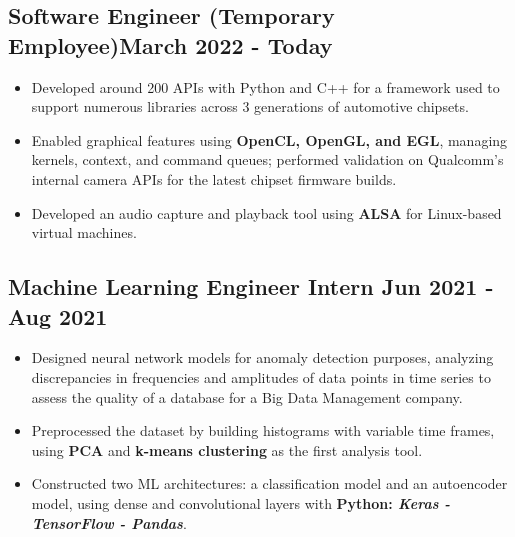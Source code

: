 \documentclass[]{article}
\begin{document}
\vspace{1ex}

\subsection{{Software Engineer (Temporary Employee)\hfill{\small{March 2022 - Today}}}}
\vspace{1.5ex}
\begin{itemize}
    \item Developed around 200 APIs with Python and C++ for a framework used to support numerous libraries across 3 generations of automotive chipsets.
    \item Enabled graphical features using \textbf{OpenCL, OpenGL, and EGL}, managing kernels, context, and command queues; performed validation on Qualcomm's internal camera APIs for the latest chipset firmware builds.
    \item Developed an audio capture and playback tool using \textbf{ALSA} for Linux-based virtual machines.
\end{itemize}

\vspace{2ex}

\subsection{Machine Learning Engineer Intern \hfill{\small{Jun 2021 - Aug 2021}}}

\vspace{1.5ex}

\begin{itemize}
    \item Designed neural network models for anomaly detection purposes, analyzing discrepancies in frequencies and amplitudes of data points in time series to assess the quality of a database for a Big Data Management company.
    \item Preprocessed the dataset by building histograms with variable time frames, using \textbf{PCA} and \textbf{k-means clustering} as the first analysis tool.
    \item Constructed two ML architectures: a classification model and an autoencoder model, using dense and convolutional layers with \textbf{Python: \textit{Keras - TensorFlow - Pandas}}.
\end{itemize}
\end{document}
